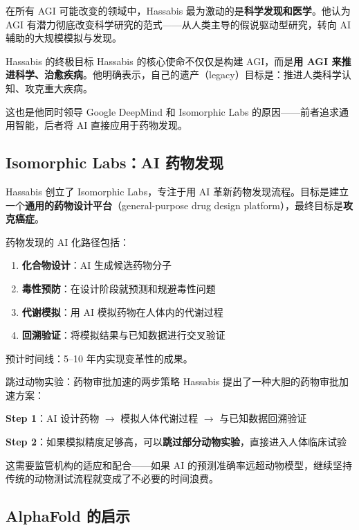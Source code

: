\documentclass[a4paper]{article}
\begin{document}
在所有 AGI 可能改变的领域中，Hassabis 最为激动的是\textbf{科学发现和医学}。他认为 AGI 有潜力彻底改变科学研究的范式——从人类主导的假说驱动型研究，转向 AI 辅助的大规模模拟与发现。

\begin{importantbox}{Hassabis 的终极目标}
Hassabis 的核心使命不仅仅是构建 AGI，而是\textbf{用 AGI 来推进科学、治愈疾病}。他明确表示，自己的遗产（legacy）目标是：推进人类科学认知、攻克重大疾病。

这也是他同时领导 Google DeepMind 和 Isomorphic Labs 的原因——前者追求通用智能，后者将 AI 直接应用于药物发现。
\end{importantbox}

\subsection{Isomorphic Labs：AI 药物发现}

Hassabis 创立了 Isomorphic Labs，专注于用 AI 革新药物发现流程。目标是建立一个\textbf{通用的药物设计平台}（general-purpose drug design platform），最终目标是\textbf{攻克癌症}。

药物发现的 AI 化路径包括：
\begin{enumerate}
    \item \textbf{化合物设计}：AI 生成候选药物分子
    \item \textbf{毒性预防}：在设计阶段就预测和规避毒性问题
    \item \textbf{代谢模拟}：用 AI 模拟药物在人体内的代谢过程
    \item \textbf{回溯验证}：将模拟结果与已知数据进行交叉验证
\end{enumerate}

预计时间线：5--10 年内实现变革性的成果。

\begin{importantbox}{跳过动物实验：药物审批加速的两步策略}
Hassabis 提出了一种大胆的药物审批加速方案：

\textbf{Step 1}：AI 设计药物 $\to$ 模拟人体代谢过程 $\to$ 与已知数据回溯验证

\textbf{Step 2}：如果模拟精度足够高，可以\textbf{跳过部分动物实验}，直接进入人体临床试验

这需要监管机构的适应和配合——如果 AI 的预测准确率远超动物模型，继续坚持传统的动物测试流程就变成了不必要的时间浪费。
\end{importantbox}

\subsection{AlphaFold 的启示}
\end{document}
